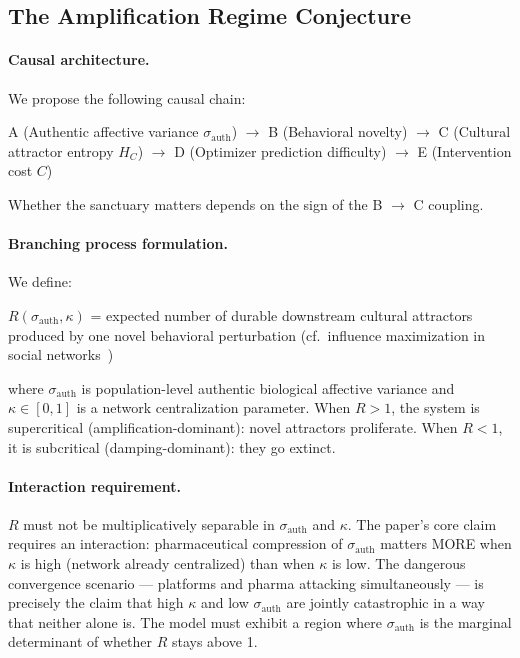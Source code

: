 \documentclass[11pt, a4paper]{article}
\theoremstyle{remark}
\begin{document}
\subsection{The Amplification Regime Conjecture}\label{sec:amplification}

\paragraph{Causal architecture.} We propose the following causal chain:

A (Authentic affective variance $\sigma_{\text{auth}}$) $\to$ B (Behavioral novelty) $\to$ C (Cultural attractor entropy $H_C$) $\to$ D (Optimizer prediction difficulty) $\to$ E (Intervention cost $C$)

Whether the sanctuary matters depends on the sign of the B $\to$ C coupling.

\paragraph{Branching process formulation.} We define:

$R(\sigma_{\text{auth}}, \kappa)$ = expected number of durable downstream cultural attractors produced by one novel behavioral perturbation (cf.\ influence maximization in social networks~\cite{kempe2003})

where $\sigma_{\text{auth}}$ is population-level authentic biological affective variance and $\kappa \in [0,1]$ is a network centralization parameter. When $R > 1$, the system is supercritical (amplification-dominant): novel attractors proliferate. When $R < 1$, it is subcritical (damping-dominant): they go extinct.

\paragraph{Interaction requirement.} $R$ must not be multiplicatively separable in $\sigma_{\text{auth}}$ and $\kappa$. The paper's core claim requires an interaction: pharmaceutical compression of $\sigma_{\text{auth}}$ matters MORE when $\kappa$ is high (network already centralized) than when $\kappa$ is low. The dangerous convergence scenario --- platforms and pharma attacking simultaneously --- is precisely the claim that high $\kappa$ and low $\sigma_{\text{auth}}$ are jointly catastrophic in a way that neither alone is. The model must exhibit a region where $\sigma_{\text{auth}}$ is the marginal determinant of whether $R$ stays above 1.
\end{document}
